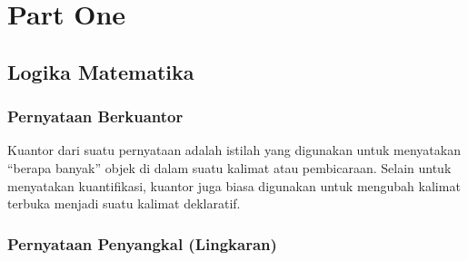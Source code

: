 \documentclass[11pt,fleqn]{book} %
\begin{document}


\pagestyle{empty} %

\tableofcontents %

\cleardoublepage %

\pagestyle{fancy} %


\part{Part One}



\chapter{Logika Matematika}

\section{Pernyataan Berkuantor}

Kuantor dari suatu pernyataan adalah istilah yang digunakan untuk menyatakan “berapa banyak” objek di dalam suatu kalimat atau pembicaraan. Selain untuk menyatakan kuantifikasi, kuantor juga biasa digunakan untuk mengubah kalimat terbuka menjadi suatu kalimat deklaratif.



\section{Pernyataan Penyangkal (Lingkaran)}
\end{document}

